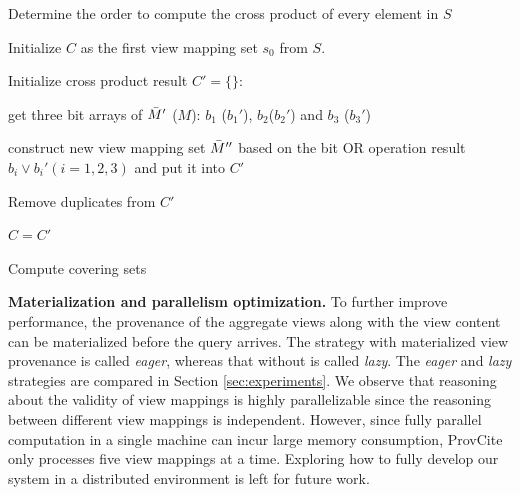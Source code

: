 \begin{example}
\begin{algorithm}[h!]
 
 Determine the order to compute the cross product of every element in $S$
 
 Initialize $C$ as the first view mapping set $s_0$ from $S$.
 
 {
    
    Initialize cross product result $C' = \{\}$:
    
    {
        {
            get three bit arrays of $\Bar{M}'$ ($M$): $b_1$ ($b_1'$), $b_2$($b_2'$) and $b_3$ ($b_3'$)
            
            construct new view mapping set $\Bar{M}''$ based on the bit OR operation result $b_i \lor b_i' (i=1,2,3)$ and put it into $C'$
        }
    }
    
    
    
    Remove duplicates from $C'$
    
    $C = C'$
    
 }
 
 \caption{Compute covering sets}
 \label{compute_covering_sets}
 \end{algorithm}




\textbf{Materialization and parallelism optimization.} To further improve performance, the provenance of the aggregate views along with the view content can be materialized before the query arrives. The strategy with  materialized view provenance is called {\em eager}, whereas that without is called {\em lazy}. The {\em eager} and {\em lazy} strategies are compared in Section \ref{sec:experiments}. We observe that reasoning about the validity of view mappings is highly parallelizable since the reasoning between different view mappings is independent.
However, since fully parallel computation in a single machine can incur large memory consumption, ProvCite only processes five view mappings at a time. Exploring how to fully develop our system in a distributed environment is left for future work.



\end{example}
